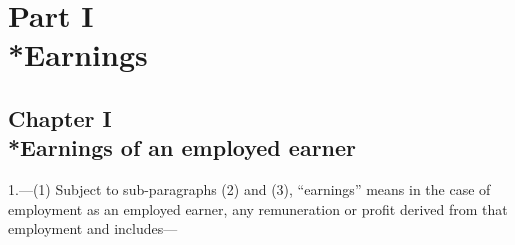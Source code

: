 \documentclass[12pt,a4paper]{article}
\begin{document}
\section[Part I --- Earnings]{Part I\\*Earnings}

\subsection[Chapter I --- Earnings of an employed earner]{Chapter I\\*Earnings of an employed earner}

\renewcommand\parthead{--- Schedule 1 Part I Chapter I}

1.—(1) Subject to sub-paragraphs (2) and (3), “earnings” means in the case of employment as an employed earner, any remuneration or profit derived from that employment and includes—
\end{document}
